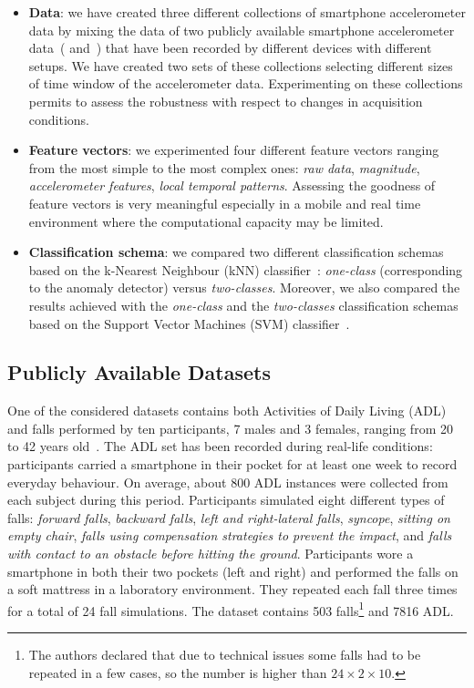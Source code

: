 \documentclass[twocolumn]{svjour3}          \smartqed  \usepackage[draft]{hyperref}
\begin{document}
\begin{itemize}
\item \textbf{Data}: we have created three different collections of smartphone accelerometer data by mixing the data of two publicly available smartphone accelerometer data~(\citet{medrano2014} and~\citet{anguita2013public}) that have been recorded by different devices with different setups. We have created two sets of these collections selecting different sizes of time window of the accelerometer data. Experimenting on these collections permits to assess the robustness with respect to changes in acquisition conditions.
\item \textbf{Feature vectors}: we experimented four different feature vectors ranging from the most simple to the most complex ones: \emph{raw data}, \emph{magnitude}, \emph{accelerometer features}, \emph{local temporal patterns}. Assessing the goodness of feature vectors is very meaningful especially in a mobile and real time environment where the computational capacity may be limited.
\item \textbf{Classification schema}: we compared two different classification schemas based on the k-Nearest Neighbour (kNN) classifier~\citep{KNN1951}: \emph{one-class} (corresponding to the anomaly detector) versus \emph{two-classes}. Moreover, we also compared the results achieved with the \emph{one-class} and the \emph{two-classes} classification schemas based on the Support Vector Machines (SVM) classifier~\citep{SVM1995}.
\end{itemize}


\subsection{Publicly Available Datasets}
One of the considered datasets contains both Activities of Daily Living (ADL) and falls performed by ten participants, 7 males and 3 females, ranging from 20 to 42 years old~\citep{medrano2014}. The ADL set has been recorded during real-life conditions: participants carried a smartphone in their pocket for at least one week to record everyday behaviour. On average, about
800 ADL instances were collected from each subject during this period. Participants simulated eight different types of falls:
\emph{forward falls}, \emph{backward falls}, \emph{left and right-lateral falls}, \emph{syncope}, \emph{sitting on empty chair}, \emph{falls using compensation strategies to prevent the impact}, and \emph{falls with contact to an obstacle before
hitting the ground}. Participants wore a smartphone in both their two pockets (left and right) and performed the falls on a soft mattress in a laboratory
environment. They repeated each fall three times for a total of 24 fall simulations. The dataset contains 503 falls\footnote{The authors declared that due to technical issues some falls had to be repeated in a few cases, so the number is higher than
$24\times2\times10$.} and 7816 ADL.
\end{document}
